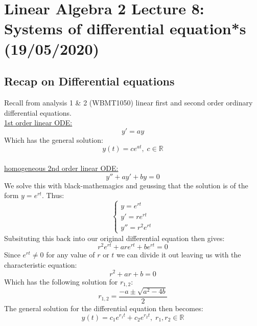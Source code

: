 \documentclass[11pt, a4paper]{article}
\newcommand*{\R}{\ensuremath{\mathbb{R}}}
\begin{document}
\setcounter{section}{7}
\setcounter{equation}{0}

\section{Linear Algebra 2 Lecture 8: Systems of differential equation*s (19/05/2020)}


\subsection{Recap on Differential equations}
Recall from analysis 1 \& 2 (WBMT1050) linear first and second order ordinary differential equations.\\
\underline{1st order linear ODE:}
\begin{equation*}
  y' = ay
\end{equation*}
Which has the general solution:
\begin{equation*}
  y(t) = ce^{at},\; c \in \R
\end{equation*}\\
\underline{homogeneous 2nd order linear ODE:}
\begin{equation*}
  y'' + ay' + by = 0
\end{equation*}
We solve this with black-mathemagics and geussing that the solution is of the form $y=e^{rt}$. Thus:
\begin{equation*}
  \begin{cases}
    y = e^{rt}\\
    y' = re^{rt}\\
    y'' = r^2e^{rt}
  \end{cases}
\end{equation*}
Subsituting this back into our original differential equation then gives:
\begin{equation*}
  r^2e^{rt} + are^{rt} + be^{rt} = 0
\end{equation*}
Since $e^{rt}\neq 0$ for any value of $r$ or $t$ we can divide it out leaving us with the characteristic equation:
\begin{equation*}
  r^2 + ar + b = 0
\end{equation*} 
Which has the following solution for $r_{1,2}$:
\begin{equation*}
  r_{1,2} = \frac{-a \pm \sqrt{a^2 - 4b}}{2}
\end{equation*}
The general solution for the differential equation then becomes:
\begin{equation*}
  y(t) = c_1e^{r_1t} + c_2e^{r_2t}, \; r_1, r_2 \in \R
\end{equation*}
\end{document}
